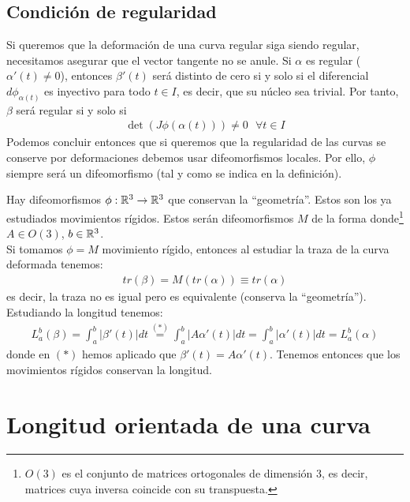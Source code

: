 \subsection{Condición de regularidad}

Si queremos que la deformación de una curva regular siga siendo regular, necesitamos asegurar que el vector tangente no se anule. Si $\alpha$ es regular ($\alpha'(t) \neq 0$), entonces $\beta'(t)$ será distinto de cero si y solo si el diferencial $d\phi_{\alpha(t)}$ es inyectivo para todo $t\in I$, es decir, que su núcleo sea trivial. Por tanto, $\beta$ será regular si y solo si
\begin{gather*}
    \det(J\phi(\alpha(t))) \neq 0\ \ \ \forall t \in I
\end{gather*}
Podemos concluir entonces que si queremos que la regularidad de las curvas se conserve por deformaciones debemos usar difeomorfismos locales. Por ello, $\phi$ siempre será un difeomorfismo (tal y como se indica en la definición).\\

\begin{observacion}
    Hay difeomorfismos $\phi : \mathbb{R}^3 \to \mathbb{R}^3$ que conservan la ``geometría''. Estos son los ya estudiados movimientos rígidos. Estos serán difeomorfismos $M$ de la forma
    donde\footnote{$O(3)$ es el conjunto de matrices ortogonales de dimensión 3, es decir, matrices cuya inversa coincide con su transpuesta.} $A\in O(3)$, $b\in \mathbb{R}^3$.\\

    Si tomamos $\phi = M$ movimiento rígido, entonces al estudiar la traza de la curva deformada tenemos:
    \begin{gather*}
        tr(\beta) = M (tr(\alpha)) \equiv tr(\alpha)
    \end{gather*}
    es decir, la traza no es igual pero es equivalente (conserva la ``geometría''). Estudiando la longitud tenemos:
    \begin{gather*}
        L_a^b (\beta) = \int_a^b |\beta'(t)| dt \overset{(\ast)}{=} \int_a^b |A\alpha'(t)| dt = \int_a^b |\alpha'(t)| dt = L_a^b (\alpha)
    \end{gather*}
    donde en $(\ast)$ hemos aplicado que $\beta'(t)=A\alpha'(t)$. Tenemos entonces que los movimientos rígidos conservan la longitud.
\end{observacion}

\section{Longitud orientada de una curva}

